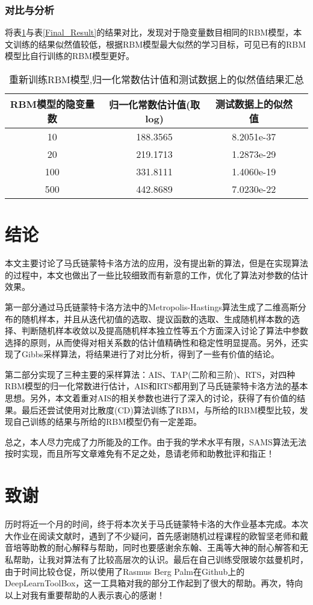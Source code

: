 \documentclass[11pt]{article}
\begin{document}
\subsubsection{对比与分析}
将表\ref{New_Result}与表\ref{Final_Result}的结果对比，发现对于隐变量数目相同的RBM模型，本文训练的结果似然值较低，根据RBM模型最大似然的学习目标，可见已有的RBM模型比自行训练的RBM模型更好。

\begin{table}[!htbp]
  \centering  
  \begin{tabular}{cccc} 
  \hline
  RBM模型的隐变量数 & 归一化常数估计值(取log) & 测试数据上的似然值 \\ \hline
  10 & 188.3565 & 8.2051e-37 \\
  20 & 219.1713 & 1.2873e-29 \\
  100 & 331.8111 & 1.4060e-19 \\
  500 & 442.8689 & 7.0230e-22\\ 
  \hline
\end{tabular}
\caption{ 重新训练RBM模型,归一化常数估计值和测试数据上的似然值结果汇总}
\label{New_Result}
\end{table}

\section{结论}
本文主要讨论了马氏链蒙特卡洛方法的应用，没有提出新的算法，但是在实现算法的过程中，本文也做出了一些比较细致而有新意的工作，优化了算法对参数的估计效果。

第一部分通过马氏链蒙特卡洛方法中的Metropolis-Hastings算法生成了二维高斯分布的随机样本，并且从迭代初值的选取、提议函数的选取、生成随机样本数的选择、判断随机样本收敛以及提高随机样本独立性等五个方面深入讨论了算法中参数选择的原则，从而使得对相关系数的估计值精确性和稳定性明显提高。另外，还实现了Gibbs采样算法，将结果进行了对比分析，得到了一些有价值的结论。

第二部分实现了三种主要的采样算法：AIS、TAP(二阶和三阶)、RTS，对四种RBM模型的归一化常数进行估计，AIS和RTS都用到了马氏链蒙特卡洛方法的基本思想。另外，本文着重对AIS的相关参数也进行了深入的讨论，获得了有价值的结果。最后还尝试使用对比散度(CD)算法训练了RBM，与所给的RBM模型比较，发现自己训练的结果与所给的RBM模型仍有一定差距。

总之，本人尽力完成了力所能及的工作。由于我的学术水平有限，SAMS算法无法按时实现，而且所写文章难免有不足之处，恳请老师和助教批评和指正！


\section{致谢}
历时将近一个月的时间，终于将本次关于马氏链蒙特卡洛的大作业基本完成。本次大作业在阅读文献时，遇到了不少疑问，首先感谢随机过程课程的欧智坚老师和戴音培等助教的耐心解释与帮助，同时也要感谢余东翰、王禹等大神的耐心解答和无私帮助，让我对算法有了比较高层次的认识。最后在自己训练受限玻尔兹曼机时，由于时间比较仓促，所以使用了Rasmus Berg Palm在Github上的DeepLearnToolBox，这一工具箱对我的部分工作起到了很大的帮助。再次，特向以上对我有重要帮助的人表示衷心的感谢！
\end{document}
